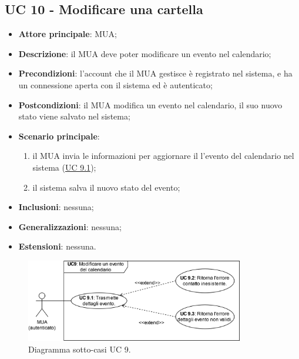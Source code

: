 \subsection{UC 10 - Modificare una cartella} \label{sec:UC10}
    \begin{itemize}
        \item \textbf{Attore principale}: MUA;
        \item \textbf{Descrizione}: il MUA deve poter modificare un evento nel calendario;
        \item \textbf{Precondizioni}: l’account che il MUA gestisce è registrato nel sistema, e ha un connessione aperta con il sistema ed è autenticato;
        \item \textbf{Postcondizioni}: il MUA modifica un evento nel calendario, il suo nuovo stato viene salvato nel sistema;
        \item \textbf{Scenario principale}:
            \begin{enumerate}
                \item il MUA invia le informazioni per aggiornare il l'evento del calendario nel sistema (\hyperref[sec:UC9.1]{UC 9.1});
                \item il sistema salva il nuovo stato del evento;
            \end{enumerate}
        \item \textbf{Inclusioni}: nessuna;
        \item \textbf{Generalizzazioni}: nessuna;
        \item \textbf{Estensioni}: nessuna.
    \end{itemize}

\begin{figure}[h]
    \includegraphics[width=0.85\textwidth]{sections/uc_imgs/UC09.X.png}
    \centering
    \caption{Diagramma sotto-casi UC 9.}
\end{figure}

